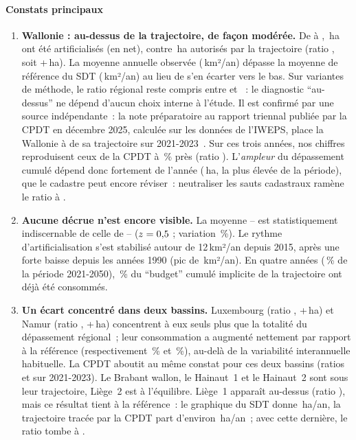 \documentclass[11pt,a4paper]{report}
\newcommand{\ha}{\,ha}
\newcommand{\haan}{\,ha/an}
\newcommand{\kmdan}{\,km²/an}
\begin{document}
\paragraph{Constats principaux}
\begin{enumerate}[leftmargin=1.4em]
\item \textbf{Wallonie : au-dessus de la trajectoire, de façon modérée.} De \AnneeDebutObs{} à \AnneeFinObs, \WalCumObs\ha{} ont été artificialisés (en net), contre \WalCumTraj\ha{} autorisés par la trajectoire (ratio \WalRatio, soit +\WalEcart\ha). La moyenne annuelle observée (\WalObsMoyKm\kmdan) dépasse la moyenne de référence du SDT (\WalRefKm\kmdan) au lieu de s'en écarter vers le bas. Sur \SensNbVariantes{} variantes de méthode, le ratio régional reste compris entre \SensMin{} et \SensMax~: le diagnostic \enquote{au-dessus} ne dépend d'aucun choix interne à l'étude. Il est confirmé par une source indépendante~: la note préparatoire au rapport triennal publiée par la CPDT en décembre 2025, calculée sur les données de l'IWEPS, place la Wallonie à \CpdtRatioWal{} de sa trajectoire sur 2021-2023~\citep{cpdt_prep2025}. Sur ces trois années, nos chiffres reproduisent ceux de la CPDT à \CpdtEcartPct\,\% près (ratio \EtudeRatioTroisWal). L'\emph{ampleur} du dépassement cumulé dépend donc fortement de l'année \AnneeFinObs{} (\WalObsFin\ha, la plus élevée de la période), que le cadastre peut encore réviser~: neutraliser les sauts cadastraux ramène le ratio à \WalRatioNeutre.
\item \textbf{Aucune décrue n'est encore visible.} La moyenne \AnneeDebutObs--\AnneeFinObs{} est statistiquement indiscernable de celle de \RefDebut--\RefFin{} ($z = 0{,}5$ ; variation \WalVarPct\,\%). Le rythme d'artificialisation s'est stabilisé autour de 12\kmdan{} depuis 2015, après une forte baisse depuis les années 1990 (pic de \PrincNonantePic\kmdan). En quatre années (\PartTempsPct\,\% de la période 2021-2050), \WalBudgetConsommePct\,\% du \enquote{budget} cumulé implicite de la trajectoire ont déjà été consommés.
\item \textbf{Un écart concentré dans deux bassins.} Luxembourg (ratio \LuxRatio, +\LuxEcart\ha) et Namur (ratio \NamRatio, +\NamEcart\ha) concentrent à eux seuls plus que la totalité du dépassement régional~; leur consommation a augmenté nettement par rapport à la référence (respectivement \LuxVarPct\,\% et \NamVarPct\,\%), au-delà de la variabilité interannuelle habituelle. La CPDT aboutit au même constat pour ces deux bassins (ratios \CpdtRatioLux{} et \CpdtRatioNam{} sur 2021-2023). Le Brabant wallon, le Hainaut~1 et le Hainaut~2 sont sous leur trajectoire, Liège~2 est à l'équilibre. Liège~1 apparaît au-dessus (ratio \LUnRatio), mais ce résultat tient à la référence~: le graphique du SDT donne \LUnRef\haan, la trajectoire tracée par la CPDT part d'environ \LUnRefCpdt\haan{}~; avec cette dernière, le ratio tombe à \LUnRatioRefCpdt.

\end{enumerate}
\end{document}
